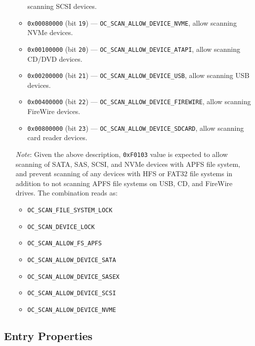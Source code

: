 \documentclass[]{article}
\makeatletter
\providecommand{\tightlist}{%
  \setlength{\itemsep}{0pt}\setlength{\parskip}{0pt}}
\renewcommand{\label}[1]{%
\zref@wrapper@immediate{\oldlabel{#1}}}  %
\makeatother
\begin{document}
\begin{enumerate}
\begin{itemize}
    scanning SCSI devices.
    \item \texttt{0x00080000} (bit \texttt{19}) --- \texttt{OC\_SCAN\_ALLOW\_DEVICE\_NVME}, allow
    scanning NVMe devices.
    \item \texttt{0x00100000} (bit \texttt{20}) --- \texttt{OC\_SCAN\_ALLOW\_DEVICE\_ATAPI}, allow
    scanning CD/DVD devices.
    \item \texttt{0x00200000} (bit \texttt{21}) --- \texttt{OC\_SCAN\_ALLOW\_DEVICE\_USB}, allow
    scanning USB devices.
    \item \texttt{0x00400000} (bit \texttt{22}) --- \texttt{OC\_SCAN\_ALLOW\_DEVICE\_FIREWIRE}, allow
    scanning FireWire devices.
    \item \texttt{0x00800000} (bit \texttt{23}) --- \texttt{OC\_SCAN\_ALLOW\_DEVICE\_SDCARD}, allow
    scanning card reader devices.
  \end{itemize}

  \emph{Note}: Given the above description, \texttt{0xF0103} value is expected to allow
  scanning of SATA, SAS, SCSI, and NVMe devices with APFS file system, and prevent scanning
  of any devices with HFS or FAT32 file systems in addition to not scanning APFS file systems
  on USB, CD, and FireWire drives. The combination reads as:
  \begin{itemize}
  \tightlist
  \item \texttt{OC\_SCAN\_FILE\_SYSTEM\_LOCK}
  \item \texttt{OC\_SCAN\_DEVICE\_LOCK}
  \item \texttt{OC\_SCAN\_ALLOW\_FS\_APFS}
  \item \texttt{OC\_SCAN\_ALLOW\_DEVICE\_SATA}
  \item \texttt{OC\_SCAN\_ALLOW\_DEVICE\_SASEX}
  \item \texttt{OC\_SCAN\_ALLOW\_DEVICE\_SCSI}
  \item \texttt{OC\_SCAN\_ALLOW\_DEVICE\_NVME}
  \end{itemize}

\end{enumerate}

\subsection{Entry Properties}\label{miscentryprops}
\end{document}
